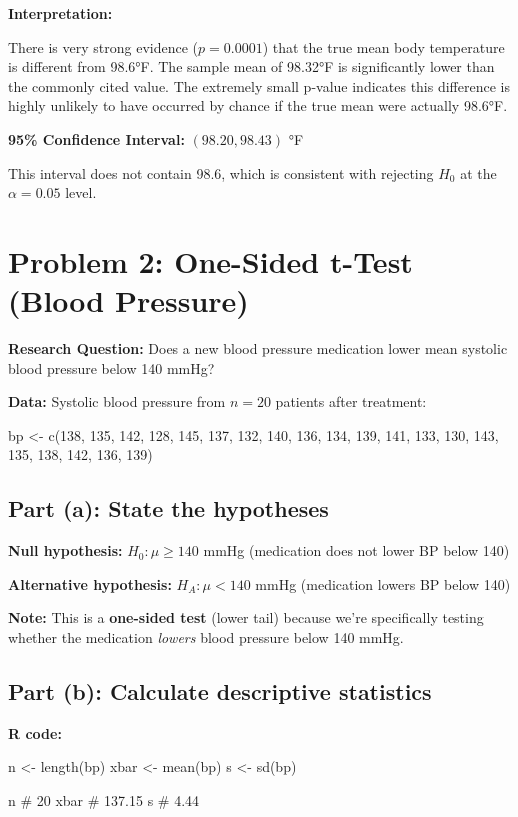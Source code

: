 \documentclass[11pt]{article}
\begin{document}
\textbf{Interpretation:}

There is very strong evidence ($p = 0.0001$) that the true mean body temperature is different from 98.6°F. The sample mean of 98.32°F is significantly lower than the commonly cited value. The extremely small p-value indicates this difference is highly unlikely to have occurred by chance if the true mean were actually 98.6°F.

\textbf{95\% Confidence Interval:} $(98.20, 98.43)$ °F

This interval does not contain 98.6, which is consistent with rejecting $H_0$ at the $\alpha = 0.05$ level.

\vspace{12pt}

\section*{Problem 2: One-Sided t-Test (Blood Pressure)}

\textbf{Research Question:} Does a new blood pressure medication lower mean systolic blood pressure below 140 mmHg?

\textbf{Data:} Systolic blood pressure from $n = 20$ patients after treatment:
\begin{rcode}
bp <- c(138, 135, 142, 128, 145, 137, 132, 140, 136, 134,
        139, 141, 133, 130, 143, 135, 138, 142, 136, 139)
\end{rcode}

\subsection*{Part (a): State the hypotheses}

\textbf{Null hypothesis:} $H_0: \mu \geq 140$ mmHg (medication does not lower BP below 140)

\textbf{Alternative hypothesis:} $H_A: \mu < 140$ mmHg (medication lowers BP below 140)

\textbf{Note:} This is a \textbf{one-sided test} (lower tail) because we're specifically testing whether the medication \textit{lowers} blood pressure below 140 mmHg.

\subsection*{Part (b): Calculate descriptive statistics}

\textbf{R code:}
\begin{rcode}
n <- length(bp)
xbar <- mean(bp)
s <- sd(bp)

n      # 20
xbar   # 137.15
s      # 4.44
\end{rcode}
\end{document}
